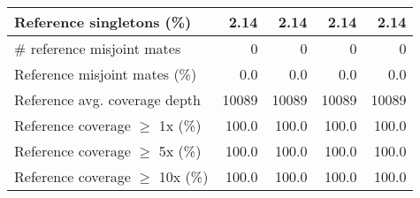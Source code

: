 \documentclass[12pt,a4paper]{article}
\begin{document}
\begin{table}[ht]
\begin{center}
\begin{tabular}{|l*{4}{|r}|}
Reference singletons (\%) & 2.14 & 2.14 & 2.14 & 2.14 \\ \hline
\# reference misjoint mates & 0 & 0 & 0 & 0 \\ \hline
Reference misjoint mates (\%) & 0.0 & 0.0 & 0.0 & 0.0 \\ \hline
Reference avg. coverage depth & 10089 & 10089 & 10089 & 10089 \\ \hline
Reference coverage $\geq$ 1x (\%) & 100.0 & 100.0 & 100.0 & 100.0 \\ \hline
Reference coverage $\geq$ 5x (\%) & 100.0 & 100.0 & 100.0 & 100.0 \\ \hline
Reference coverage $\geq$ 10x (\%) & 100.0 & 100.0 & 100.0 & 100.0 \\ \hline
\end{tabular}
\end{center}
\end{table}
\end{document}
